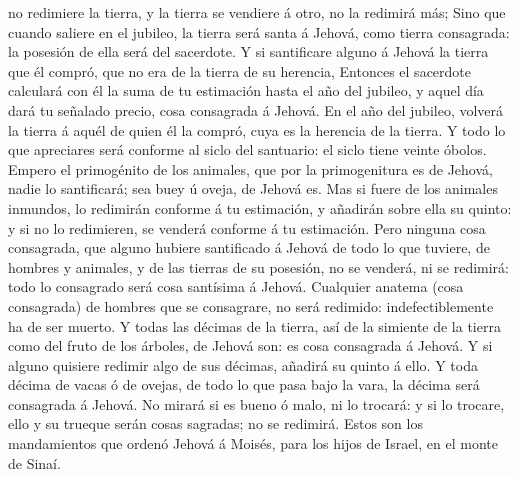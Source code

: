 no redimiere la tierra, y la tierra se vendiere á otro, no la redimirá
más;  Sino que cuando saliere en el jubileo, la tierra será
santa á Jehová, como tierra consagrada: la posesión de ella será del
sacerdote.  Y si santificare alguno á Jehová la tierra que
él compró, que no era de la tierra de su herencia, 
Entonces el sacerdote calculará con él la suma de tu estimación hasta el
año del jubileo, y aquel día dará tu señalado precio, cosa consagrada á
Jehová.  En el año del jubileo, volverá la tierra á aquél
de quien él la compró, cuya es la herencia de la tierra.  Y
todo lo que apreciares será conforme al siclo del santuario: el siclo
tiene veinte óbolos.  Empero el primogénito de los
animales, que por la primogenitura es de Jehová, nadie lo santificará;
sea buey ú oveja, de Jehová es.  Mas si fuere de los
animales inmundos, lo redimirán conforme á tu estimación, y añadirán
sobre ella su quinto: y si no lo redimieren, se venderá conforme á tu
estimación.  Pero ninguna cosa consagrada, que alguno
hubiere santificado á Jehová de todo lo que tuviere, de hombres y
animales, y de las tierras de su posesión, no se venderá, ni se
redimirá: todo lo consagrado será cosa santísima á Jehová. 
Cualquier anatema (cosa consagrada) de hombres que se consagrare, no
será redimido: indefectiblemente ha de ser muerto.  Y todas
las décimas de la tierra, así de la simiente de la tierra como del fruto
de los árboles, de Jehová son: es cosa consagrada á Jehová.
 Y si alguno quisiere redimir algo de sus décimas, añadirá
su quinto á ello.  Y toda décima de vacas ó de ovejas, de
todo lo que pasa bajo la vara, la décima será consagrada á Jehová.
 No mirará si es bueno ó malo, ni lo trocará: y si lo
trocare, ello y su trueque serán cosas sagradas; no se redimirá.
 Estos son los mandamientos que ordenó Jehová á Moisés,
para los hijos de Israel, en el monte de Sinaí.
